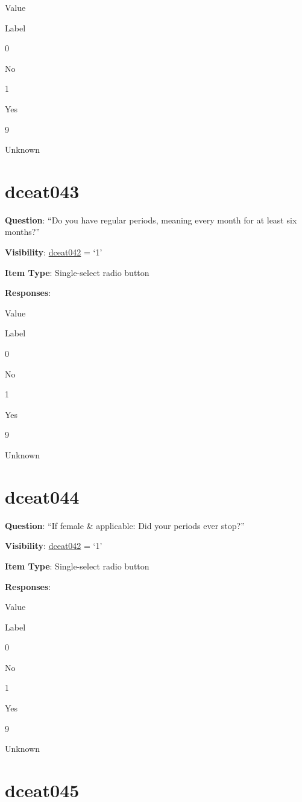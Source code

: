 \documentclass[]{book}
\begin{document}
Value

Label

0

No

1

Yes

9

Unknown

\hypertarget{dceat043}{%
\section{dceat043}\label{dceat043}}

\textbf{Question}: ``Do you have regular periods, meaning every month for at least six months?''

\textbf{Visibility}: \protect\hyperlink{dceat042}{dceat042} = `1'

\textbf{Item Type}: Single-select radio button

\textbf{Responses}:

Value

Label

0

No

1

Yes

9

Unknown

\hypertarget{dceat044}{%
\section{dceat044}\label{dceat044}}

\textbf{Question}: ``If female \& applicable: Did your periods ever stop?''

\textbf{Visibility}: \protect\hyperlink{dceat042}{dceat042} = `1'

\textbf{Item Type}: Single-select radio button

\textbf{Responses}:

Value

Label

0

No

1

Yes

9

Unknown

\hypertarget{dceat045}{%
\section{dceat045}\label{dceat045}}
\end{document}
